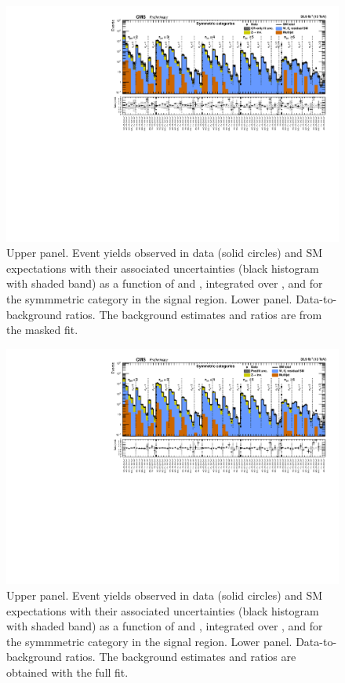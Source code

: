 \clearpage
\begin{figure}[h!]
  \centering
  \caption{Upper panel. Event yields observed in data (solid circles)
    and SM expectations with their associated uncertainties (black
    histogram with shaded band) as a function of \nb and \scalht,
    integrated over \mht, and for the symmmetric \njet category
    in the signal region. Lower panel. Data-to-background ratios. The
    background estimates and ratios are from the masked fit. }
  \label{fig:mr_symm_pre}
  \includegraphics[width=1.\linewidth]{figures/results/36invfb_preapproval/symm/summaryPlot_Symmetric_prefit}
\end{figure}

\clearpage
\begin{figure}[h!]
  \centering
  \caption{Upper panel. Event yields observed in data (solid circles)
    and SM expectations with their associated uncertainties (black
    histogram with shaded band) as a function of \nb and \scalht,
    integrated over \mht, and for the symmmetric \njet category
    in the signal region. Lower panel. Data-to-background ratios. The
    background estimates and ratios are obtained with the full fit. }
  \label{fig:mr_symm_post}
  \includegraphics[width=1.\linewidth]{figures/results/36invfb_preapproval/symm/summaryPlot_Symmetric_fit_b}
\end{figure}

